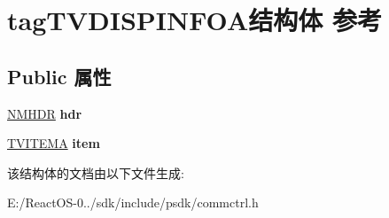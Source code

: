 \hypertarget{structtag_t_v_d_i_s_p_i_n_f_o_a}{}\section{tag\+T\+V\+D\+I\+S\+P\+I\+N\+F\+O\+A结构体 参考}
\label{structtag_t_v_d_i_s_p_i_n_f_o_a}
\subsection*{Public 属性}
\begin{DoxyCompactItemize}
\item 
\mbox{\label{structtag_t_v_d_i_s_p_i_n_f_o_a_aadbafdf45dbdbc1b0709fe3c29b9058e}} 
\hyperlink{structtag_n_m_h_d_r}{N\+M\+H\+DR} {\bfseries hdr}
\item 
\mbox{\label{structtag_t_v_d_i_s_p_i_n_f_o_a_a3dc6d42ece1f92042008f97d12e0ef6e}} 
\hyperlink{structtag_t_v_i_t_e_m_a}{T\+V\+I\+T\+E\+MA} {\bfseries item}
\end{DoxyCompactItemize}


该结构体的文档由以下文件生成\+:\begin{DoxyCompactItemize}
\item 
E\+:/\+React\+O\+S-\/0../sdk/include/psdk/commctrl.\+h\end{DoxyCompactItemize}
